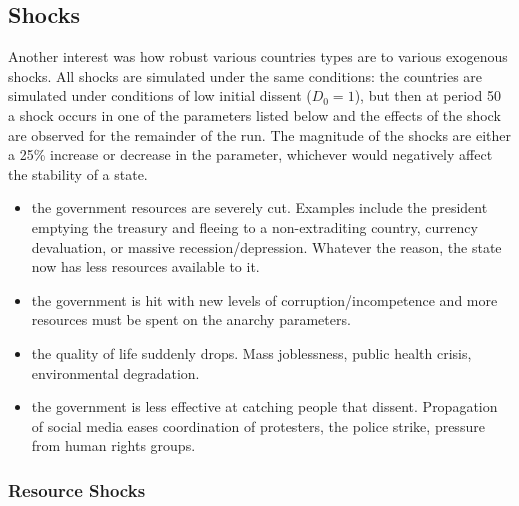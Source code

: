 \documentclass[12pt]{article}
\begin{document}
\begin{spacing}{1.5}
\subsection{Shocks}

Another interest was how robust various countries types are to various exogenous shocks. All shocks are simulated under the same conditions: the countries are simulated under conditions of low initial dissent ($D_0 = 1$), but then at period 50 a shock occurs in one of the parameters listed below and the effects of the shock are observed for the remainder of the run. The magnitude of the shocks are either a 25\% increase or decrease in the parameter, whichever would negatively affect the stability of a state.  

\begin{itemize}
	\item {} the government resources are severely cut. Examples include the president emptying the treasury and fleeing to a non-extraditing country, currency devaluation, or massive recession/depression. Whatever the reason, the state now has less resources available to it.  
	\item \boldmath{$\Omega,\Phi$:} the government is hit with new levels of corruption/incompetence and more resources must be spent on the anarchy parameters. 
	\item {} the quality of life suddenly drops. Mass joblessness, public health crisis, environmental degradation. 
	\item \boldmath{$\sigma$:} the government is less effective at catching people that dissent. Propagation of social media eases coordination of protesters, the police strike, pressure from human rights groups.     
\end{itemize}

\subsubsection{Resource Shocks} 


\end{spacing}
\end{document}
